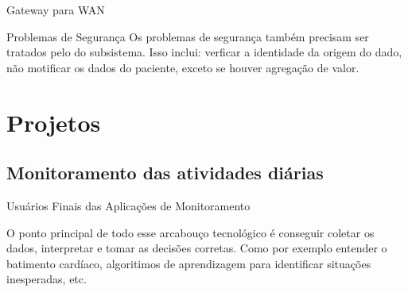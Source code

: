 \documentclass{beamer}
\begin{document}
\begin{frame}{Gateway para WAN}
  \begin{block}{Problemas de Segurança}
   Os problemas de segurança também precisam ser tratados pelo  do subsistema. Isso inclui: verficar a identidade da origem do dado, não motificar os dados do paciente, exceto se houver agregação de valor.
  \end{block}
\end{frame}

\section{Projetos}
\subsection{Monitoramento das atividades diárias}
\begin{frame}{Usuários Finais das Aplicações de Monitoramento}
  \begin{block}{}
   O ponto principal de todo esse arcabouço tecnológico é conseguir coletar os dados, interpretar e tomar as decisões corretas. Como por exemplo entender o batimento cardíaco, algoritimos de aprendizagem para identificar situações inesperadas, etc. 
  \end{block}
\end{frame}

% 
\end{document}
